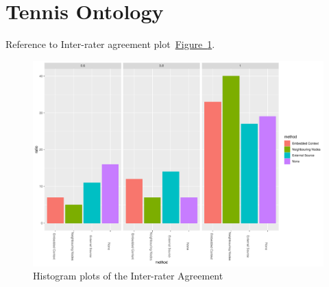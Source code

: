\section{Tennis Ontology}\label{sec:result_t_ontology}


Reference to Inter-rater agreement plot~\hyperref[fig:hist_agreement_tennis_all]{Figure~\ref*{fig:hist_agreement_tennis_all}}.
\begin{figure}
  	 \includegraphics[width=\textwidth]{plots/tennis/hist_agreement}
  	 \caption{Histogram plots of the Inter-rater Agreement}\label{fig:hist_agreement_tennis_all}
\end{figure}



